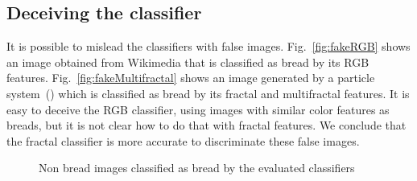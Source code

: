 \documentclass[oneside,a4paper,english,links]{amca}
\begin{document}
\subsection{Deceiving the classifier}
It is possible to mislead the classifiers with false images. Fig.~\ref{fig:fakeRGB} shows an image obtained from Wikimedia that is classified as bread by its RGB features. Fig.~\ref{fig:fakeMultifractal} shows an image generated by a particle system~(\cite{Baravalle2011}) which is classified as bread by its fractal and multifractal features. It is easy to deceive the RGB classifier, using images with similar color features as breads, but it is not clear how to do that with fractal features. We conclude that the fractal classifier is more accurate to discriminate these false images.

\begin{figure}
\begin{centering}
\par\end{centering}
\caption{Non bread images classified as bread by the evaluated classifiers}
\end{figure}
\end{document}
